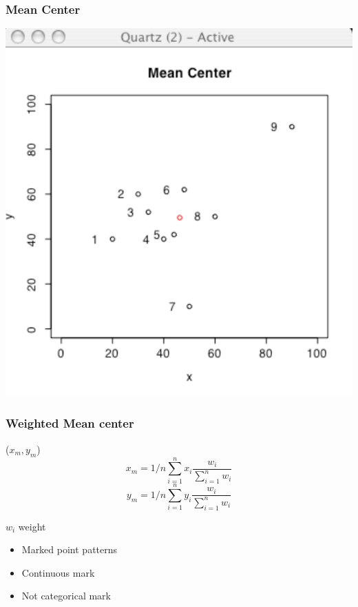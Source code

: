 \documentclass[nototal]{beamer}
\begin{document}
\begin{frame}
   \frametitle{Mean Center}
   \begin{center}
     \includegraphics[width=.65\linewidth]{meancenter}
   \end{center}
 \end{frame}


 \begin{frame}
   \frametitle{Weighted Mean center}
   \begin{block}{($x_m,y_m$)}
     \begin{equation}
       x_m = 1/n \sum_{i=1}^n  x_i \frac{w_i}{\sum_{i=1}^n w_i}
     \end{equation}
     \begin{equation}
       y_m = 1/n \sum_{i=1}^n  y_i \frac{w_i}{\sum_{i=1}^n w_i}
     \end{equation}
    \end{block}
    \begin{block}{$w_i$ weight}
      \begin{itemize}
	\item Marked point patterns
	\item Continuous mark
	\item Not categorical mark
      \end{itemize}
    \end{block}
  \end{frame}
\end{document}
